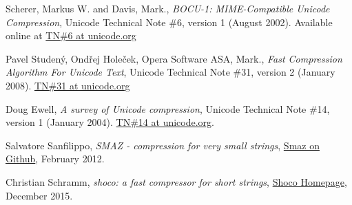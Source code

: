 \documentclass[]{article}
\begin{document}
\begin{thebibliography}{1}
		 Scherer, Markus W. and Davis, Mark., {\em BOCU-1: MIME-Compatible Unicode Compression}, Unicode Technical Note \#6, version 1 (August 2002). Available online at \href{http://www.unicode.org/notes/tn6/}{TN\#6 at unicode.org}
		
		 Pavel Studený, Ondřej Holeček, Opera Software ASA, Mark., {\em Fast Compression Algorithm For Unicode Text}, Unicode Technical Note \#31, version 2 (January 2008). \href{http://www.unicode.org/notes/tn31}{TN\#31 at unicode.org}
		
		 Doug Ewell, {\em A survey of Unicode compression}, Unicode Technical Note \#14, version 1 (January 2004). \href{http://www.unicode.org/notes/tn14/}{TN\#14 at unicode.org}.
		
		 Salvatore Sanfilippo, {\em SMAZ - compression for very small strings}, \href{https://github.com/antirez/smaz}{Smaz on Github}, February 2012.
		
		 Christian Schramm, {\em shoco: a fast compressor for short strings}, \href{https://ed-von-schleck.github.io/shoco}{Shoco Homepage}, December 2015.
		
	\end{thebibliography}
	
\end{document}
